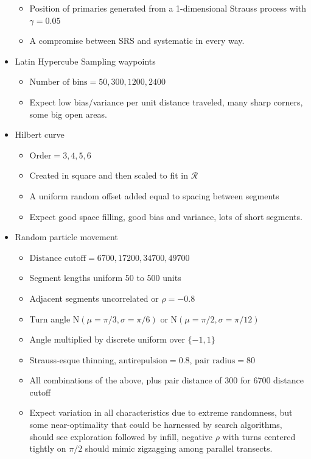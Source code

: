\documentclass[review]{elsarticle}
\begin{document}
\begin{itemize}
\begin{itemize}
\item Position of primaries generated from a 1-dimensional Strauss process with
\(\gamma = 0.05\)
\item A compromise between SRS and systematic in every way.
\end{itemize}
\item Latin Hypercube Sampling waypoints
\begin{itemize}
\item \(\text{Number of bins} = 50, 300, 1200, 2400\)
\item Expect low bias/variance per unit distance traveled, many sharp corners,
some big open areas.
\end{itemize}
\item Hilbert curve
\begin{itemize}
\item \(\text{Order} = 3, 4, 5, 6\)
\item Created in square and then scaled to fit in \(\mathcal{R}\)
\item A uniform random offset added equal to spacing between segments
\item Expect good space filling, good bias and variance, lots of short
segments.
\end{itemize}
\item Random particle movement
\begin{itemize}
\item \(\text{Distance cutoff} = 6700, 17200, 34700, 49700\)
\item Segment lengths uniform 50 to 500 units
\item Adjacent segments uncorrelated or \(\rho = -0.8\)
\item Turn angle \(\mathrm{N}(\mu = \pi / 3, \sigma = \pi / 6)\) or
\(\mathrm{N}(\mu = \pi / 2, \sigma = \pi / 12)\)
\item Angle multiplied by discrete uniform over \(\{-1, 1\}\)
\item Strauss-esque thinning, \(\text{antirepulsion} = 0.8\),
\(\text{pair radius} = 80\)
\item All combinations of the above, plus pair distance of 300 for 6700
distance cutoff
\item Expect variation in all characteristics due to extreme randomness, but
some near-optimality that could be harnessed by search algorithms, should see
exploration followed by infill, negative \(\rho\) with turns centered tightly
on \(\pi / 2\) should mimic zigzagging among parallel transects.
\end{itemize}
\end{itemize}
\end{document}
